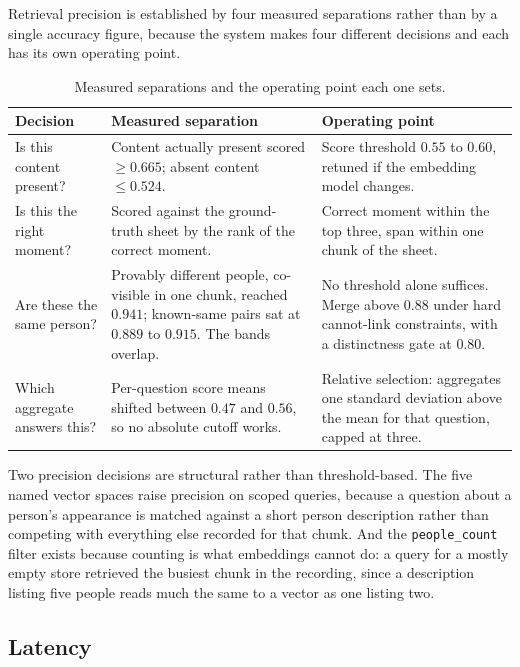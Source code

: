 \documentclass[11pt,a4paper]{article}
\begin{document}
Retrieval precision is established by four measured separations rather than by a
single accuracy figure, because the system makes four different decisions and
each has its own operating point.

\begin{table}[htbp]
\centering
\small
\begin{tabularx}{\textwidth}{@{}L{3.0cm}XL{2.6cm}@{}}
\toprule
\textbf{Decision} & \textbf{Measured separation} & \textbf{Operating point} \\
\midrule
Is this content present? & Content actually present scored $\geq 0.665$; absent content $\leq 0.524$. & Score threshold $0.55$ to $0.60$, retuned if the embedding model changes. \\
Is this the right moment? & Scored against the ground-truth sheet by the rank of the correct moment. & Correct moment within the top three, span within one chunk of the sheet. \\
Are these the same person? & Provably different people, co-visible in one chunk, reached $0.941$; known-same pairs sat at $0.889$ to $0.915$. The bands overlap. & No threshold alone suffices. Merge above $0.88$ under hard cannot-link constraints, with a distinctness gate at $0.80$. \\
Which aggregate answers this? & Per-question score means shifted between $0.47$ and $0.56$, so no absolute cutoff works. & Relative selection: aggregates one standard deviation above the mean for that question, capped at three. \\
\bottomrule
\end{tabularx}
\caption{Measured separations and the operating point each one sets.}
\end{table}

Two precision decisions are structural rather than threshold-based. The five
named vector spaces raise precision on scoped queries, because a question about
a person's appearance is matched against a short person description rather than
competing with everything else recorded for that chunk. And the
\texttt{people\_count} filter exists because counting is what embeddings cannot
do: a query for a mostly empty store retrieved the busiest chunk in the
recording, since a description listing five people reads much the same to a
vector as one listing two.

\subsection{Latency}
\end{document}
